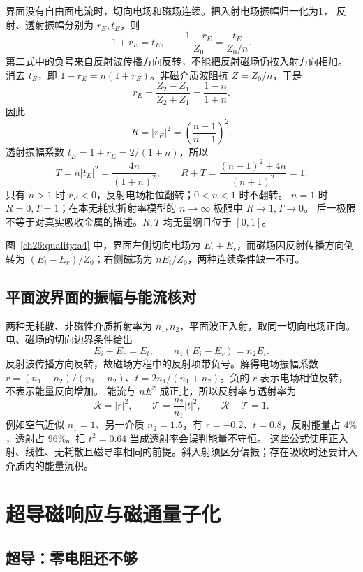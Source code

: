 {\begin{xesolution}
\begin{center}
\begin{minipage}{.96\linewidth}
\begin{tikzpicture}[>=Latex,font=\small,every node/.style={fill=none},scale=.88]
\end{tikzpicture}
\end{minipage}\end{center}

界面没有自由面电流时，切向电场和磁场连续。把入射电场振幅归一化为1，
反射、透射振幅分别为 $r_E,t_E$，则
\[
 1+r_E=t_E,\qquad \frac{1-r_E}{Z_0}=\frac{t_E}{Z_0/n}.
\]
第二式中的负号来自反射波传播方向反转，不能把反射磁场仍按入射方向相加。
消去 $t_E$，即 $1-r_E=n(1+r_E)$。非磁介质波阻抗 $Z=Z_0/n$，于是
\[
 r_E=\frac{Z_2-Z_1}{Z_2+Z_1}
 =\frac{1-n}{1+n}.
\]
因此
\[
 \boxed{R=|r_E|^2=\left(\frac{n-1}{n+1}\right)^2}.
\]
透射振幅系数 $t_E=1+r_E=2/(1+n)$，所以
\[
 T=n|t_E|^2=\frac{4n}{(1+n)^2},\qquad
 R+T=\frac{(n-1)^2+4n}{(n+1)^2}=1.
\]
只有 $n>1$ 时 $r_E<0$，反射电场相位翻转；$0<n<1$ 时不翻转。
$n=1$ 时 $R=0,T=1$；在本无耗实折射率模型的 $n\to\infty$ 极限中 $R\to1,T\to0$。
后一极限不等于对真实吸收金属的描述。$R,T$ 均无量纲且位于 $[0,1]$。

图~\ref{ch26:quality:a4} 中，界面左侧切向电场为 $E_i+E_r$，而磁场因反射传播方向倒转为 $(E_i-E_r)/Z_0$；右侧磁场为 $nE_t/Z_0$，两种连续条件缺一不可。
\end{xesolution}


\subsection{平面波界面的振幅与能流核对}
两种无耗散、非磁性介质折射率为 $n_1,n_2$，平面波正入射，取同一切向电场正向。电、磁场的切向边界条件给出
\[
 E_i+E_r=E_t,\qquad n_1(E_i-E_r)=n_2E_t.
\]
反射波传播方向反转，故磁场方程中的反射项带负号。解得电场振幅系数
$r=(n_1-n_2)/(n_1+n_2)$、$t=2n_1/(n_1+n_2)$。负的 $r$ 表示电场相位反转，不表示能量反向增加。
能流与 $nE^2$ 成正比，所以反射率与透射率为
\[
 \mathcal R=|r|^2,\qquad \mathcal T=\frac{n_2}{n_1}|t|^2,
 \qquad \mathcal R+\mathcal T=1.
\]
例如空气近似 $n_1=1$、另一介质 $n_2=1.5$，有 $r=-0.2$、$t=0.8$，反射能量占 $4\%$，透射占 $96\%$。把 $t^2=0.64$ 当成透射率会误判能量不守恒。
这些公式使用正入射、线性、无耗散且磁导率相同的前提。斜入射须区分偏振；存在吸收时还要计入介质内的能量沉积。


\section{超导磁响应与磁通量子化}

\subsection{超导：零电阻还不够}


}
